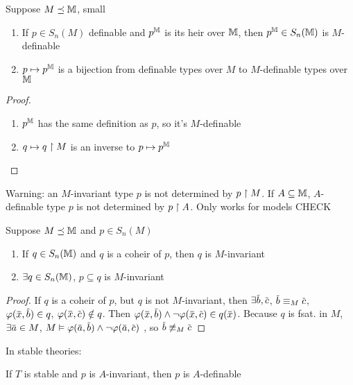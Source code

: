 \documentclass[11pt]{article}
\begin{document}
\begin{proposition}[]
\label{3.10.15}
Suppose \(M\preceq\mathbb{M}\), small
\begin{enumerate}
\item If \(p\in S_n(M)\) definable and \(p^{\mathbb{M}}\) is its heir over \(\mathbb{M}\), then \(p^{\mathbb{M}}\in S_n(\mathbb{M})\)
is \(M\)-definable
\item \(p\mapsto p^{\mathbb{M}}\) is a bijection from definable types over \(M\) to \(M\)-definable types over \(\mathbb{M}\)
\end{enumerate}
\end{proposition}

\begin{proof}
\begin{enumerate}
\item \(p^{\mathbb{M}}\) has the same definition as \(p\), so it's \(M\)-definable
\item \(q\mapsto q\upharpoonright M\) is an inverse to \(p\mapsto p^{\mathbb{M}}\)
\end{enumerate}
\end{proof}

Warning: an \(M\)-invariant type \(p\) is not determined by \(p\upharpoonright M\).
If \(A\subseteq\mathbb{M}\), \(A\)-definable type \(p\) is not determined by \(p\upharpoonright A\). Only works for models
CHECK

\begin{theorem}[]
\label{3.10.17}
Suppose \(M\preceq\mathbb{M}\) and \(p\in S_n(M)\)
\begin{enumerate}
\item If \(q\in S_n(\mathbb{M})\) and \(q\) is a coheir of \(p\), then \(q\) is \(M\)-invariant
\item \(\exists q\in S_n(\mathbb{M})\), \(p\subseteq q\) is \(M\)-invariant
\end{enumerate}
\end{theorem}

\begin{proof}
If \(q\) is a coheir of \(p\), but \(q\) is not \(M\)-invariant,
then \(\exists\barb,\barc\), \(\barb\equiv_M\barc\), \(\varphi(\barx,\barb)\in q\), \(\varphi(\barx,\barc)\notin q\).
Then \(\varphi(\barx,\barb)\wedge\neg\varphi(\barx,\barc)\in q(\barx)\). Because \(q\) is fsat.
in \(M\), \(\exists\bara\in M\), \(M\vDash\varphi(\bara,\barb)\wedge\neg\varphi(\bara,\barc)\) , so \(\barb\not\equiv_M\barc\)
\end{proof}

In stable theories:
\begin{lemma}[]
If \(T\) is stable and \(p\) is \(A\)-invariant, then \(p\) is \(A\)-definable
\end{lemma}
\end{document}
